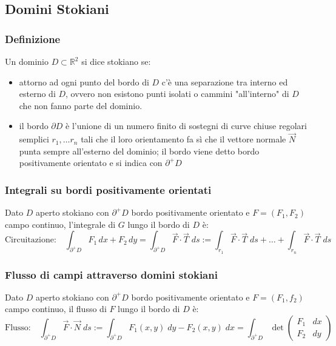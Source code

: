 \documentclass[a4paper]{article}
\newcommand\Rd{\mathbb{R}^2}  %
\begin{document}
\subsection{Domini Stokiani}
\subsubsection*{Definizione}
Un dominio \(D \subset \Rd\) si dice stokiano se:
\begin{itemize}
	\item attorno ad ogni punto del bordo di \(D\) c'è una separazione tra interno ed esterno di \(D\), ovvero non esistono punti
	isolati o cammini "all'interno" di \(D\) che non fanno parte del dominio.
	\item il bordo \(\partial D\) è l'unione di un numero finito di sostegni di curve chiuse regolari semplici \(r_1, \dots r_n\)
	tali che il loro orientamento fa sì che il vettore normale \(\vec{N}\) punta sempre all'esterno del dominio; il bordo viene
	detto bordo positivamente orientato e si indica con \(\partial^+D\)
\end{itemize}

\subsubsection*{Integrali su bordi positivamente orientati}
Dato \(D\) aperto stokiano con \(\partial^+D\) bordo positivamente orientato e \(F = (F_1,F_2)\) campo continuo, l'integrale di \(G\)
lungo il bordo di \(D\) è:
\[\text{Circuitazione:} \quad \int_{\partial^+D} F_1 \, dx + F_2 \, dy = \int_{\partial^+D} \vec{F} \cdot \vec{T} \; ds := \int_{r_1} \vec{F} \cdot \vec{T} \; ds + \dots + \int_{r_n} \vec{F} \cdot \vec{T} \; ds\]

\subsubsection*{Flusso di campi attraverso domini stokiani}
Dato \(D\) aperto stokiano con \(\partial^+D\) bordo positivamente orientato e \(F = (F_1,f_2)\) campo continuo, il flusso di \(F\)
lungo il bordo di \(D\) è:
\[\text{Flusso:} \quad \int_{\partial^+D} \vec{F} \cdot \vec{N} \; ds := \int_{\partial^+D} F_1(x,y) \; dy - F_2(x,y) \; dx = \int_{\partial^+D} \det \left(\begin{matrix} F_1 & dx \\ F_2 & dy \end{matrix}\right)\]

\newpage
\end{document}
